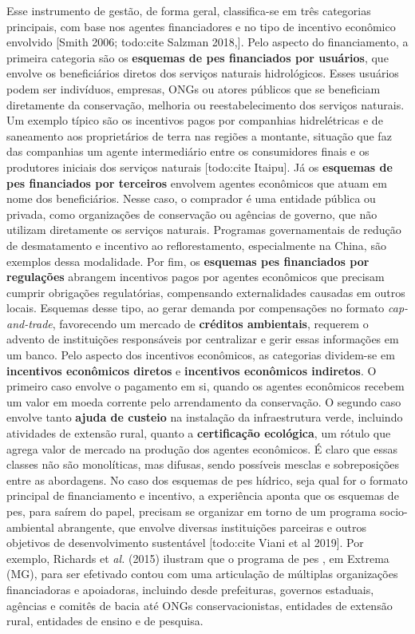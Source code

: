 \documentclass[./main.tex]{subfiles}
\begin{document}
\par Esse instrumento de gestão, de forma geral, classifica-se em três categorias principais, com base nos agentes financiadores e no tipo de incentivo econômico envolvido [Smith 2006; todo:cite Salzman 2018,]. Pelo aspecto do financiamento, a primeira categoria são os \textbf{esquemas de \acrshort{pes} financiados por usuários}, que envolve os beneficiários diretos dos serviços naturais hidrológicos. Esses usuários podem ser indivíduos, empresas, ONGs ou atores públicos que se beneficiam diretamente da conservação, melhoria ou reestabelecimento dos serviços naturais. Um exemplo típico são os incentivos pagos por companhias hidrelétricas e de saneamento aos proprietários de terra nas regiões a montante, situação que faz das companhias um agente intermediário entre os consumidores finais e os produtores iniciais dos serviços naturais [todo:cite Itaipu]. Já os \textbf{esquemas de \acrshort{pes} financiados por terceiros} envolvem agentes econômicos que atuam em nome dos beneficiários. Nesse caso, o comprador é uma entidade pública ou privada, como organizações de conservação ou agências de governo, que não utilizam diretamente os serviços naturais. Programas governamentais de redução de desmatamento e incentivo ao reflorestamento, especialmente na China, são exemplos dessa modalidade. Por fim, os \textbf{esquemas \acrshort{pes} financiados por regulações} abrangem incentivos pagos por agentes econômicos que precisam cumprir obrigações regulatórias, compensando externalidades causadas em outros locais. Esquemas desse tipo, ao gerar demanda por compensações no formato \textit{cap-and-trade}, favorecendo um mercado de \textbf{créditos ambientais}, requerem o advento de instituições responsáveis por centralizar e gerir essas informações em um banco. Pelo aspecto dos incentivos econômicos, as categorias dividem-se em \textbf{incentivos econômicos diretos} e \textbf{incentivos econômicos indiretos}. O primeiro caso envolve o pagamento em si, quando os agentes econômicos recebem um valor em moeda corrente pelo arrendamento da conservação. O segundo caso envolve tanto \textbf{ajuda de custeio} na instalação da infraestrutura verde, incluindo atividades de extensão rural, quanto a \textbf{certificação ecológica}, um rótulo que agrega valor de mercado na produção dos agentes econômicos. É claro que essas classes não são monolíticas, mas difusas, sendo possíveis mesclas e sobreposições entre as abordagens. No caso dos esquemas de \acrshort{pes} hídrico, seja qual for o formato principal de financiamento e incentivo, a experiência aponta que os esquemas de \acrshort{pes}, para saírem do papel, precisam se organizar em torno de um programa socio-ambiental abrangente, que envolve diversas instituições parceiras e outros objetivos de desenvolvimento sustentável [todo:cite Viani et al 2019]. Por exemplo, Richards et \textit{al.} (2015) \cite{Richards1931a} ilustram que o programa de \acrshort{pes} , em Extrema (MG), para ser efetivado contou com uma articulação de múltiplas organizações financiadoras e apoiadoras, incluindo desde prefeituras, governos estaduais, agências e comitês de bacia até ONGs conservacionistas, entidades de extensão rural, entidades de ensino e de pesquisa.   
\end{document}
